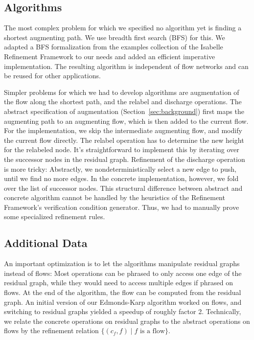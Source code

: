 \documentclass[smallcondensed]{svjour3}     %
\begin{document}
  \subsection{Algorithms}
  The most complex problem for which we specified no algorithm yet is finding a shortest augmenting path.
  We use breadth first search (BFS) for this. We adapted a BFS formalization from the examples collection of the Isabelle Refinement Framework to
  our needs and added an efficient imperative implementation. The resulting algorithm 
  is independent of flow networks and can be reused for other applications.
  
  Simpler problems for which we had to develop algorithms are augmentation of the flow along the shortest path, and the relabel and discharge operations.
  The abstract specification of augmentation (\cf Section~\ref{sec:background}) first maps the augmenting path to an augmenting flow, which is then added 
  to the current flow. For the implementation, we skip the intermediate augmenting flow, and modify the current flow directly.
  The relabel operation has to determine the new height for the relabeled node. It's straightforward to implement this by iterating over the 
  successor nodes in the residual graph. Refinement of the discharge operation is more tricky: Abstractly, we nondeterministically select a new edge to push, 
  until we find no more edges.
  In the concrete implementation, however, we fold over the list of successor nodes.
  This structural difference between abstract and concrete algorithm cannot be handled by the heuristics of the Refinement Framework's verification condition generator.
  Thus, we had to manually prove some specialized refinement rules.
  
  \subsection{Additional Data}\label{sec:impl_add_data}
  An important optimization is to let the algorithms manipulate residual graphs instead of flows: 
  Most operations can be phrased to only access one edge of the residual graph, while they would 
  need to access multiple edges if phrased on flows. At the end of the algorithm, the flow can be 
  computed from the residual graph. 
  An initial version of our Edmonds-Karp algorithm worked on flows, and switching to residual graphs yielded a speedup of roughly factor 2.
  Technically, we relate the concrete operations on residual graphs to the abstract operations on flows by the refinement 
  relation $\{(c_f,f) \mid \text{$f$ is a flow}\}$.
\end{document}
